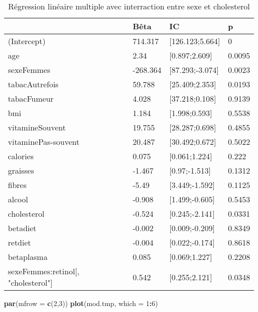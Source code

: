 \documentclass[]{article}
\newenvironment{Shaded}{\begin{snugshade}}{\end{snugshade}}
\newcommand{\KeywordTok}[1]{\textcolor[rgb]{0.13,0.29,0.53}{\textbf{#1}}}
\newcommand{\DataTypeTok}[1]{\textcolor[rgb]{0.13,0.29,0.53}{#1}}
\newcommand{\DecValTok}[1]{\textcolor[rgb]{0.00,0.00,0.81}{#1}}
\newcommand{\OperatorTok}[1]{\textcolor[rgb]{0.81,0.36,0.00}{\textbf{#1}}}
\newcommand{\NormalTok}[1]{#1}
\begin{document}
\begin{table}

\caption{\label{tab:unnamed-chunk-67}Régression linéaire multiple avec interraction entre sexe et cholesterol}
\centering
\begin{tabular}[t]{l|l|l|l}
\hline
  & Bêta & IC & p\\
\hline
\rowcolor[HTML]{BBD2E1}  (Intercept) & 714.317 & [126.123;5.664] & 0\\
\hline
age & 2.34 & [0.897;2.609] & 0.0095\\
\hline
\rowcolor[HTML]{BBD2E1}  sexeFemmes & -268.364 & [87.293;-3.074] & 0.0023\\
\hline
tabacAutrefois & 59.788 & [25.409;2.353] & 0.0193\\
\hline
\rowcolor[HTML]{BBD2E1}  tabacFumeur & 4.028 & [37.218;0.108] & 0.9139\\
\hline
bmi & 1.184 & [1.998;0.593] & 0.5538\\
\hline
\rowcolor[HTML]{BBD2E1}  vitamineSouvent & 19.755 & [28.287;0.698] & 0.4855\\
\hline
vitaminePas-souvent & 20.487 & [30.492;0.672] & 0.5022\\
\hline
\rowcolor[HTML]{BBD2E1}  calories & 0.075 & [0.061;1.224] & 0.222\\
\hline
graisses & -1.467 & [0.97;-1.513] & 0.1312\\
\hline
\rowcolor[HTML]{BBD2E1}  fibres & -5.49 & [3.449;-1.592] & 0.1125\\
\hline
alcool & -0.908 & [1.499;-0.605] & 0.5453\\
\hline
\rowcolor[HTML]{BBD2E1}  cholesterol & -0.524 & [0.245;-2.141] & 0.0331\\
\hline
betadiet & -0.002 & [0.009;-0.209] & 0.8349\\
\hline
\rowcolor[HTML]{BBD2E1}  retdiet & -0.004 & [0.022;-0.174] & 0.8618\\
\hline
betaplasma & 0.085 & [0.069;1.227] & 0.2208\\
\hline
\rowcolor[HTML]{BBD2E1}  sexeFemmes:retinol[, "cholesterol"] & 0.542 & [0.255;2.121] & 0.0348\\
\hline
\end{tabular}
\end{table}

\begin{Shaded}
\begin{Highlighting}[]
\KeywordTok{par}\NormalTok{(}\DataTypeTok{mfrow =} \KeywordTok{c}\NormalTok{(}\DecValTok{2}\NormalTok{,}\DecValTok{3}\NormalTok{))}
\KeywordTok{plot}\NormalTok{(mod.tmp, }\DataTypeTok{which =} \DecValTok{1}\OperatorTok{:}\DecValTok{6}\NormalTok{)}
\end{Highlighting}
\end{Shaded}
\end{document}
